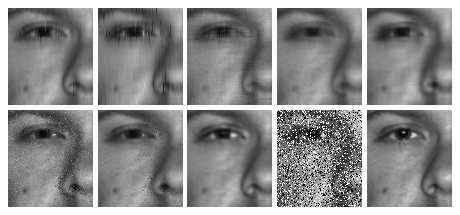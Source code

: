 \includegraphics[width=0.095\linewidth]{DN_yale/yale_03_1_cauchy_st_fsim} 
\includegraphics[width=0.095\linewidth]{DN_yale/yale_03_1_welsh_st_fsim} 
\includegraphics[width=0.095\linewidth]{DN_yale/yale_03_1_cvpr2016_tnn_fsim}
\includegraphics[width=0.095\linewidth]{DN_yale/yale_03_1_horpca_s_fsim} 
\includegraphics[width=0.095\linewidth]{DN_yale/yale_03_1_nctrpca_fsim} 
\includegraphics[width=0.095\linewidth]{DN_yale/yale_03_1_rnndl_fsim} 
\includegraphics[width=0.095\linewidth]{DN_yale/yale_03_1_rpca_fsim} 
\includegraphics[width=0.095\linewidth]{DN_yale/yale_03_1_rpca2d_l1_fsim}
\includegraphics[width=0.095\linewidth]{Ref/yale_1_03_original}
\includegraphics[width=0.095\linewidth]{Ref/yale_1_original}

